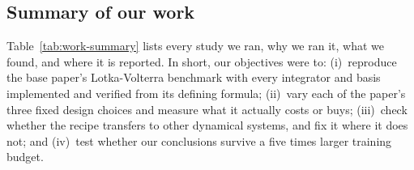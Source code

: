 \subsection{Summary of our work}
\label{sec:work-summary}

Table~\ref{tab:work-summary} lists every study we ran, why we ran it, what we
found, and where it is reported. In short, our objectives were to:
(i)~reproduce the base paper's Lotka-Volterra benchmark with every
integrator and basis implemented and verified from its defining formula;
(ii)~vary each of the paper's three fixed design choices and measure what
it actually costs or buys; (iii)~check whether the recipe transfers to other
dynamical systems, and fix it where it does not; and (iv)~test whether our
conclusions survive a five times larger training budget.

